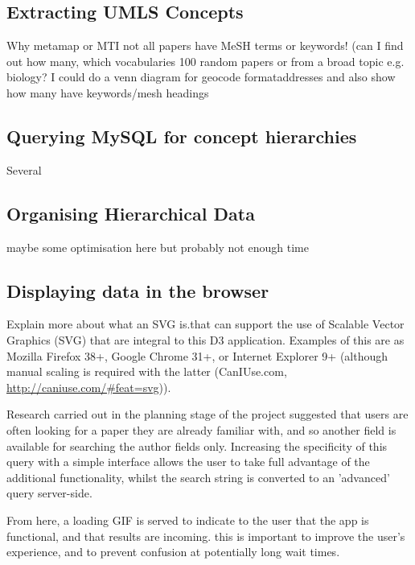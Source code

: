 \documentclass[Report.tex]{subfiles}
\begin{document}
\subsection{Extracting UMLS Concepts}
Why metamap or MTI not all papers have MeSH terms or keywords! (can I find out how many, which vocabularies 100 random papers or from a broad topic e.g. biology? I could do a venn diagram for geocode formataddresses and also show how many have keywords/mesh headings

\subsection{Querying MySQL for concept hierarchies}
Several 

\subsection{Organising Hierarchical Data}
maybe some optimisation here but probably not enough time

\subsection{Displaying data in the browser}
Explain more about what an SVG is.that can support the use of Scalable Vector Graphics (SVG) that are integral to this D3 application. Examples of this are as Mozilla Firefox 38+, Google Chrome 31+, or Internet Explorer 9+ (although manual scaling is required with the latter (CanIUse.com, \url{http://caniuse.com/#feat=svg})).

Research carried out in the planning stage of the project suggested that users are often looking for a paper they are already familiar with, and so another field is available for searching the author fields only. Increasing the specificity of this query with a simple interface allows the user to take full advantage of the additional functionality, whilst the search string is converted to an 'advanced' query server-side.

From here, a loading GIF is served to indicate to the user that the app is functional, and that results are incoming. this is important to improve the user's experience, and to prevent confusion at potentially long wait times.
\end{document}
